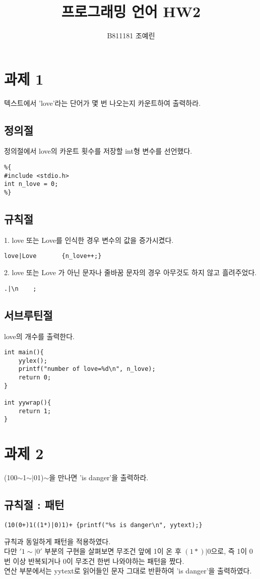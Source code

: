 \documentclass{article}
\begin{document}
	\title{프로그래밍 언어 HW2}
	\author{B811181 조예린}
	\maketitle
	
	\section{과제 1}
	텍스트에서 'love'라는 단어가 몇 번 나오는지 카운트하여 출력하라.
	\subsection{정의절}
	정의절에서 love의 카운트 횟수를 저장할 int형 변수를 선언했다.
	\begin{lstlisting}
%{
#include <stdio.h>
int n_love = 0;
%}
	\end{lstlisting}
	\subsection{규칙절}
	1. love 또는 Love를 인식한 경우 변수의 값을 증가시켰다.
	\begin{lstlisting}
love|Love		{n_love++;}
	\end{lstlisting}
	2. love 또는 Love 가 아닌 문자나 줄바꿈 문자의 경우 아무것도 하지 않고 흘려주었다.
	\begin{lstlisting}
.|\n	;
	\end{lstlisting}

	\subsection{서브루틴절}
	love의 개수를 출력한다.
	\begin{lstlisting}
int main(){
	yylex();
	printf("number of love=%d\n", n_love);
	return 0;
}

int yywrap(){
	return 1;
}
	\end{lstlisting}



	\section{과제 2}
	(100$\sim$1$\sim|$01)$\sim$을 만나면 'is danger'을 출력하라.
	\subsection{규칙절 : 패턴}
	\begin{lstlisting}
(10(0+)1((1*)|0)1)+	{printf("%s is danger\n", yytext);}
	\end{lstlisting}
	규칙과 동일하게 패턴을 적용하였다. \\
	다만 $'1\sim|0'$ 부분의 구현을 살펴보면 무조건 앞에 1이 온 후 $(1*)|0$으로, 즉 1이 0번 이상 반복되거나 0이 무조건 한번 나와야하는 패턴을 짰다.\\
	연산 부분에서는 yytext로 읽어들인 문자 그대로 반환하여 'is danger'을 출력하였다.
	
\end{document}
